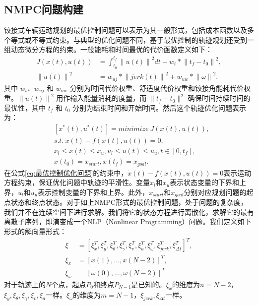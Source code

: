 \documentclass[master,academic]{ysuthesis} %
\begin{document}
		\subsection{NMPC问题构建}
		铰接式车辆运动规划的最优控制问题可以表示为其一般形式，包括成本函数以及多个等式或不等式约束。与典型的优化问题不同，基于最优控制的轨迹规划还受到一组动态微分方程的约束。一般能耗和时间最优的代价函数定义如下：
		\begin{equation}
			\begin{aligned}
				J(x(t),u(t)) &= \int_{t_0}^{t_f}
				\left\| u(t)\right\|^2dt +w_t*\left\|t_f-t_0\right\|^2,    \\
				\left\|u(t)\right\|^2&=w_{uj}*\left\|jerk(t)\right\|^2+w_{uw}*\left\|\omega\right\|^2.
			\end{aligned} 
		\end{equation}
		其中 $w_t$、$w_{uj}$ 和 $w_{uw}$ 分别为时间代价权重、舒适度代价权重和铰接角能耗代价权重。$\left\|u(t)\right\|^2$ 用作输入能量消耗的度量，而 $\|t_f- t_0\|^2$ 确保时间持续时间的最优性，其中 $t_f$ 和 $t_0$ 分别为结束时间和开始时间。然后这个轨迹优化问题表示为：
		\begin{equation}
			\begin{aligned}
				&\left[x^*(t),u^*(t)\right] = minimize\ J(x(t),u(t)),\\      
				&s.t.\ \dot x(t)-f(x(t),u(t))=0,\\
				&x_l \leq x(t) \leq x_u, u_l \leq u(t) \leq u_u,t\in \left[0,t_f\right],\\
				&x(t_0)=x_{start},x(t_f)=x_{goal}.\label{eq:最优控制优化问题}
			\end{aligned}   
		\end{equation}
		在公式\ref{eq:最优控制优化问题}的约束中，$\dot x(t)-f(x(t),u(t))=0$表示运动方程约束，保证优化问题中轨迹的平滑性。变量$x_l$和$x_u$表示状态变量的下界和上界，$u_l$和$u_u$表示控制变量的下界和上界。此外，$x_{start}$和$x_{goal}$分别对应规划问题的起点状态和终点状态。对于如上NMPC形式的最优控制问题，处于问题的复杂度，我们并不在连续空间下进行求解。我们将它的状态方程进行离散化，求解它的最有离散子序列，即演变成一个NLP（Nonlinear Programming）问题。我们定义如下形式的解向量形式：
		\begin{equation}
			\begin{aligned}
				\xi &=\left[ \xi _{x}^{T},\xi _{y}^{T},\xi _{\theta}^{T},\xi _{\gamma}^{T},\xi _{v}^{T},\xi _{a}^{T},\xi _{\omega}^{T},\xi_{{jerk}}^{T},\xi _{\Delta t}^{T} \right] ^T,\\
				\xi _x&=\left[ x\left( 1 \right) ,...,x\left( N-2 \right) \right] ^T,\\
				\xi _{\omega}&=\left[ \omega \left( 0 \right) ,...,\omega \left( N-2 \right) \right] ^T.
			\end{aligned}   
		\end{equation}
		对于轨迹上的$N$个点，起点$P_0$和终点$P_{N-1}$是已知的。$\xi _{x}$的维度为$n=N-2$，$\xi _{y},\xi _{\theta},\xi _{\gamma},\xi _{v},\xi _{a}$一样。$\xi _{\omega}$的维度为$m=N-1$，$\xi_{jerk},\xi _{\Delta t}$一样。
\end{document}
